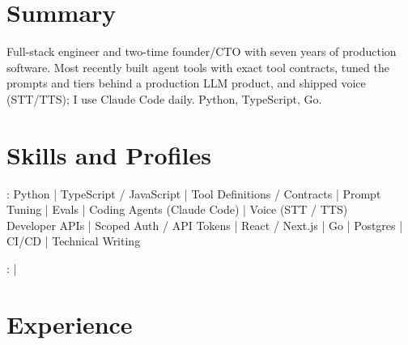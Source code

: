 \documentclass[print]{jack-resume}
\begin{document}
\pagecolor{darkmodeBackground}


\begin{minipage}[t][1cm][t]{.03\textwidth}
    \hfill
\end{minipage}

\section{Summary}
Full-stack engineer and two-time founder/CTO with seven years of production software. Most recently built agent tools with exact tool contracts, tuned the prompts and tiers behind a production LLM product, and shipped voice (STT/TTS); I use Claude Code daily. Python, TypeScript, Go.
\sectionsep

\section{Skills and Profiles}
:
Python \hfill | \hfill
TypeScript / JavaScript \hfill | \hfill
Tool Definitions / Contracts \hfill | \hfill
Prompt Tuning \hfill | \hfill
Evals \hfill | \hfill
Coding Agents (Claude Code) \hfill | \hfill
Voice (STT / TTS) \\
\hspace{1.0cm} Developer APIs \hfill | \hfill
Scoped Auth / API Tokens \hfill | \hfill
React / Next.js \hfill | \hfill
Go \hfill | \hfill
Postgres \hfill | \hfill
CI/CD \hfill | \hfill
Technical Writing \\

\raggedright{
    :
      \href{https://www.linkedin.com/in/jack-sturtevant/}{ \ExternalLink} |
     \href{https://github.com/jacksturt}{ \ExternalLink}}

\section{Experience}
\end{document}
